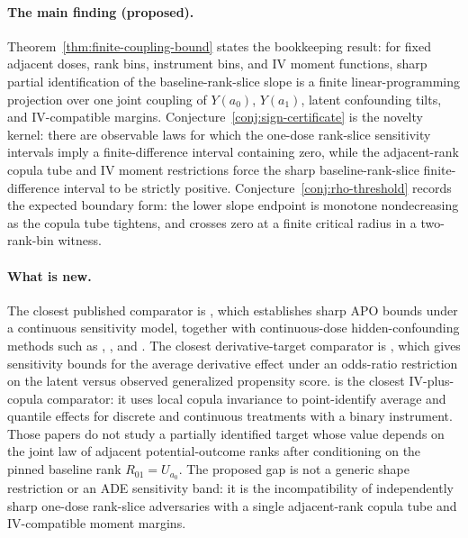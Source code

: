\documentclass[11pt]{article}
\theoremstyle{definition}
\theoremstyle{plain}
\theoremstyle{remark}
\begin{document}
\paragraph{The main finding (proposed).}
Theorem~\ref{thm:finite-coupling-bound} states the bookkeeping result: for fixed adjacent doses, rank bins, instrument bins, and IV moment functions, sharp partial identification of the baseline-rank-slice slope is a finite linear-programming projection over one joint coupling of \(Y(a_0)\), \(Y(a_1)\), latent confounding tilts, and IV-compatible margins.  Conjecture~\ref{conj:sign-certificate} is the novelty kernel: there are observable laws for which the one-dose rank-slice sensitivity intervals imply a finite-difference interval containing zero, while the adjacent-rank copula tube and IV moment restrictions force the sharp baseline-rank-slice finite-difference interval to be strictly positive.  Conjecture~\ref{conj:rho-threshold} records the expected boundary form: the lower slope endpoint is monotone nondecreasing as the copula tube tightens, and crosses zero at a finite critical radius in a two-rank-bin witness.

\paragraph{What is new.}
The closest published comparator is \citet{BaitairianSebastienJreichKatsahianGuilloux2025}, which establishes sharp APO bounds under a continuous sensitivity model, together with continuous-dose hidden-confounding methods such as \citet{JessonDouglasManshausenSolalMeinshausenStierGalShalit2022}, \citet{MarmarelisHaddadJessonJahanshadGalstyanVerSteeg2023}, and \citet{DalalTchetgenTchetgen2025}.  The closest derivative-target comparator is \citet{Zhang2025ADE}, which gives sensitivity bounds for the average derivative effect under an odds-ratio restriction on the latent versus observed generalized propensity score.  \citet{ChernozhukovFernandezValHanWuthrich2024} is the closest IV-plus-copula comparator: it uses local copula invariance to point-identify average and quantile effects for discrete and continuous treatments with a binary instrument.  Those papers do not study a partially identified target whose value depends on the joint law of adjacent potential-outcome ranks after conditioning on the pinned baseline rank \(R_{01}=U_{a_0}\).  The proposed gap is not a generic shape restriction or an ADE sensitivity band: it is the incompatibility of independently sharp one-dose rank-slice adversaries with a single adjacent-rank copula tube and IV-compatible moment margins.
\end{document}
